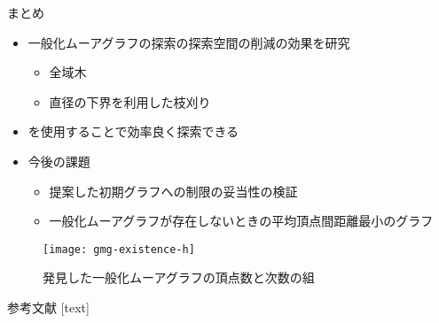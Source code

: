 \begin{frame}{まとめ}
  \begin{itemize}
  \item 一般化ムーアグラフの探索の探索空間の削減の効果を研究
    \begin{itemize}
    \item 全域木
    \item 直径の下界を利用した枝刈り
    \end{itemize}
  \item[] を使用することで効率良く探索できる
  \item 今後の課題
    \begin{itemize}
    \item 提案した初期グラフへの制限の妥当性の検証
    \item 一般化ムーアグラフが存在しないときの平均頂点間距離最小のグラフ
    \end{itemize}
  \end{itemize}
  \begin{figure}
    \centering
    \texttt{[image: gmg-existence-h]}
    \caption{発見した一般化ムーアグラフの頂点数と次数の組}
  \end{figure}
\end{frame}

\appendix
\begin{frame}[allowframebreaks]{参考文献}
  [text]
  
\end{frame}

